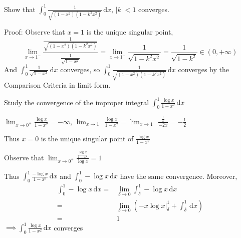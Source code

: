 
\begin{example}
    Show that $\int_0^1\frac{1}{\sqrt{(1-x^2)(1-k^2x^2)}}\,\mathrm{d}x$, $|k|<1$ converges.

    Proof: Observe that $x=1$ is the unique singular point,
    $$\lim_{x\to1^-}\frac{\frac{1}{\sqrt{(1-x^2)(1-k^2x^2)}}}{\frac{1}{\sqrt{1-x^2}}}=\lim_{x\to1^-}\frac{1}{\sqrt{1-k^2x^2}}=\frac{1}{\sqrt{1-k^2}}\in(0,+\infty)$$
    And $\int_0^1\frac{1}{\sqrt{1-x^2}}\,\mathrm{d}x$ converges, so $\int_0^1\frac{1}{\sqrt{(1-x^2)(1-k^2x^2)}}\,\mathrm{d}x$ converges by the Comparison Criteria in limit form.
\end{example}

\begin{example}
    Study the convergence of the improper integral $\int_0^1\frac{\log x}{1-x^2}\,\mathrm{d}x$

    $\lim_{x\to0^+}\frac{\log x}{1-x^2}=-\infty$, $\lim_{x\to 1^-}\frac{\log x}{1-x^2}=\lim_{x\to 1^-}\frac{\frac{1}{x}}{-2x}=-\frac{1}{2}$

    Thus $x=0$ is the unique singular point of $\frac{\log x}{1-x^2}$

    Observe that $\lim_{x\to 0^+}\frac{\frac{\log x}{1-x^2}}{\log x}=1$

    Thus $\int_0^1\frac{-\log x}{1-x^2}\,\mathrm{d}x$ and $\int_0^1-\log x\,\mathrm{d}x$ have the same convergence. Moreover,
    \begin{align*}
        \int_0^1-\log x\,\mathrm{d}x= & \lim_{\delta\to0}\int_{\delta}^1-\log x\,\mathrm{d}x                                        \\
        =                             & \lim_{\delta\to0}\left(\left.-x\log x\right|_{\delta}^1+\int_{\delta}^1\,\mathrm{d}x\right) \\
        =                             & 1
    \end{align*}
    $\implies\int_0^1\frac{\log x}{1-x^2}\,\mathrm{d}x$ converges
\end{example}

